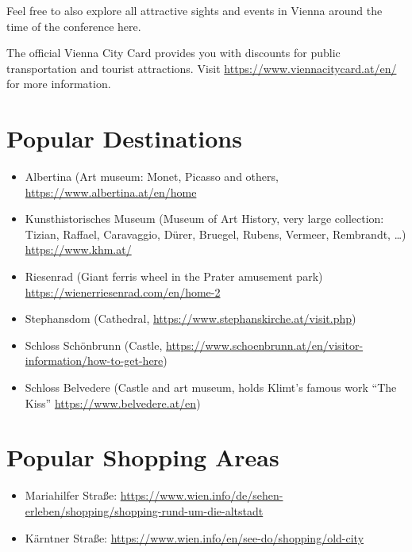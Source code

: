 Feel free to also explore all attractive sights and events in Vienna around the time of the conference here.

The official Vienna City Card provides you with discounts for public transportation and tourist attractions. Visit \url{https://www.viennacitycard.at/en/} for more information.

\section*{Popular Destinations}
\begin{itemize}

\item Albertina (Art museum: Monet, Picasso and others, \url{https://www.albertina.at/en/home}

\item Kunsthistorisches Museum (Museum of Art History, very large collection: Tizian, Raffael, Caravaggio, Dürer, Bruegel, Rubens, Vermeer, Rembrandt, …) \url{https://www.khm.at/}

\item Riesenrad (Giant ferris wheel in the Prater amusement park) \url{https://wienerriesenrad.com/en/home-2}

\item Stephansdom (Cathedral, \url{https://www.stephanskirche.at/visit.php})

\item Schloss Schönbrunn (Castle, \url{https://www.schoenbrunn.at/en/visitor-information/how-to-get-here})

\item Schloss Belvedere (Castle and art museum, holds Klimt’s famous work “The Kiss” \url{https://www.belvedere.at/en})
\end{itemize}

\section*{Popular Shopping Areas}
\begin{itemize}

\item Mariahilfer Straße: \url{https://www.wien.info/de/sehen-erleben/shopping/shopping-rund-um-die-altstadt}

\item Kärntner Straße: \url{https://www.wien.info/en/see-do/shopping/old-city}

\end{itemize}
